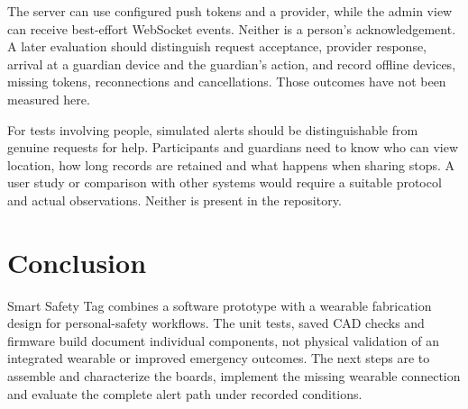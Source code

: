 \documentclass[nolineno]{ieeeaccess}
\begin{document}
The server can use configured push tokens and a provider, while the admin view can receive best-effort WebSocket events. Neither is a person's acknowledgement. A later evaluation should distinguish request acceptance, provider response, arrival at a guardian device and the guardian's action, and record offline devices, missing tokens, reconnections and cancellations. Those outcomes have not been measured here.

For tests involving people, simulated alerts should be distinguishable from genuine requests for help. Participants and guardians need to know who can view location, how long records are retained and what happens when sharing stops. A user study or comparison with other systems would require a suitable protocol and actual observations. Neither is present in the repository.

\section{Conclusion}
Smart Safety Tag combines a software prototype with a wearable fabrication design for personal-safety workflows. The unit tests, saved CAD checks and firmware build document individual components, not physical validation of an integrated wearable or improved emergency outcomes. The next steps are to assemble and characterize the boards, implement the missing wearable connection and evaluate the complete alert path under recorded conditions.\EOD


\end{document}

